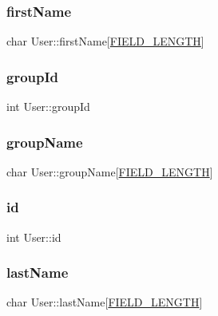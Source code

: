 \subsubsection{\texorpdfstring{firstName}{firstName}}
{\footnotesize\ttfamily char User\+::first\+Name\mbox{[}\mbox{\hyperlink{mydb_8h_a4e8ecaf2d59499a8c159ccdf7be1baec}{F\+I\+E\+L\+D\+\_\+\+L\+E\+N\+G\+TH}}\mbox{]}}

\mbox{\label{structUser_a0705d63129ed97d6215449972bdd4093}} 
\subsubsection{\texorpdfstring{groupId}{groupId}}
{\footnotesize\ttfamily int User\+::group\+Id}

\mbox{\label{structUser_a12c064564ff31a9c7610f1e7322e5fc4}} 
\subsubsection{\texorpdfstring{groupName}{groupName}}
{\footnotesize\ttfamily char User\+::group\+Name\mbox{[}\mbox{\hyperlink{mydb_8h_a4e8ecaf2d59499a8c159ccdf7be1baec}{F\+I\+E\+L\+D\+\_\+\+L\+E\+N\+G\+TH}}\mbox{]}}

\mbox{\label{structUser_aa7e6e39b43020bbe9c3a196b3689b0f7}} 
\subsubsection{\texorpdfstring{id}{id}}
{\footnotesize\ttfamily int User\+::id}

\mbox{\label{structUser_a4b36f115eb1b13a6d0d6075548d773e5}} 
\subsubsection{\texorpdfstring{lastName}{lastName}}
{\footnotesize\ttfamily char User\+::last\+Name\mbox{[}\mbox{\hyperlink{mydb_8h_a4e8ecaf2d59499a8c159ccdf7be1baec}{F\+I\+E\+L\+D\+\_\+\+L\+E\+N\+G\+TH}}\mbox{]}}

